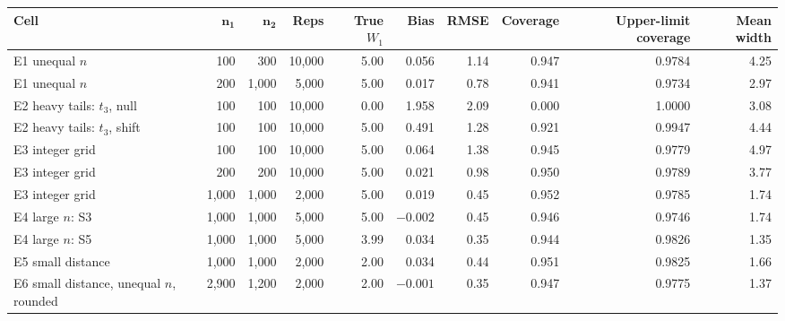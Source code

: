 {\footnotesize\setlength{\tabcolsep}{4pt}
\begin{tabular}{lrrrrrrrrr}
\toprule
\textbf{Cell} & $\boldsymbol{n_1}$ & $\boldsymbol{n_2}$ & \textbf{Reps} & \textbf{True $W_1$} & \textbf{Bias} & \textbf{RMSE} & \textbf{Coverage} & \textbf{Upper-limit coverage} & \textbf{Mean width} \\
\midrule
E1 unequal $n$ & 100 & 300 & 10{,}000 & 5.00 & 0.056 & 1.14 & 0.947 & 0.9784 & 4.25 \\
E1 unequal $n$ & 200 & 1{,}000 & 5{,}000 & 5.00 & 0.017 & 0.78 & 0.941 & 0.9734 & 2.97 \\
E2 heavy tails: $t_3$, null & 100 & 100 & 10{,}000 & 0.00 & 1.958 & 2.09 & 0.000 & 1.0000 & 3.08 \\
E2 heavy tails: $t_3$, shift & 100 & 100 & 10{,}000 & 5.00 & 0.491 & 1.28 & 0.921 & 0.9947 & 4.44 \\
E3 integer grid & 100 & 100 & 10{,}000 & 5.00 & 0.064 & 1.38 & 0.945 & 0.9779 & 4.97 \\
E3 integer grid & 200 & 200 & 10{,}000 & 5.00 & 0.021 & 0.98 & 0.950 & 0.9789 & 3.77 \\
E3 integer grid & 1{,}000 & 1{,}000 & 2{,}000 & 5.00 & 0.019 & 0.45 & 0.952 & 0.9785 & 1.74 \\
E4 large $n$: S3 & 1{,}000 & 1{,}000 & 5{,}000 & 5.00 & $-0.002$ & 0.45 & 0.946 & 0.9746 & 1.74 \\
E4 large $n$: S5 & 1{,}000 & 1{,}000 & 5{,}000 & 3.99 & 0.034 & 0.35 & 0.944 & 0.9826 & 1.35 \\
E5 small distance & 1{,}000 & 1{,}000 & 2{,}000 & 2.00 & 0.034 & 0.44 & 0.951 & 0.9825 & 1.66 \\
E6 small distance, unequal $n$, rounded & 2{,}900 & 1{,}200 & 2{,}000 & 2.00 & $-0.001$ & 0.35 & 0.947 & 0.9775 & 1.37 \\
\bottomrule
\end{tabular}
}
